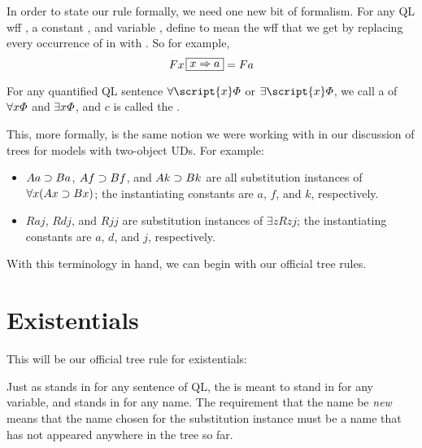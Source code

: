 In order to state our rule formally, we need one new bit of formalism. For any QL wff \metaA{}, a constant , and variable , define \metaA{} to mean the wff that we get by replacing every occurrence of  in \metaA{} with . So for example, $$Fx\substitute{x}{a} = Fa$$

For any quantified QL sentence $\forall \script{x} \metaA{}$ or $\exists \script{x} \metaA{}$, we call \metaA{} a  of $\forall x\varPhi{}$ and $\exists x\varPhi{}$, and $c$ is called the .

This, more formally, is the same notion we were working with in our discussion of trees for models with two-object UDs. For example:

\begin{itemize}
\item $Aa \supset Ba$, $Af \supset Bf$, and $Ak \supset Bk$ are all substitution instances of $\forall x(Ax \supset Bx)$; the instantiating constants are $a$, $f$, and $k$, respectively.
\item $Raj$, $Rdj$, and $Rjj$ are substitution instances of $\exists zRzj$; the instantiating constants are $a$, $d$, and $j$, respectively.
\end{itemize}

With this terminology in hand, we can begin with our official tree rules.

\section{Existentials}

This will be our official tree rule for existentials:


Just as \metaA{} stands in for any sentence of QL, the  is meant to stand in for any variable, and  stands in for any name. The requirement that the name be \emph{new} means that the name chosen for the substitution instance must be a name that has not appeared anywhere in the tree so far. 

